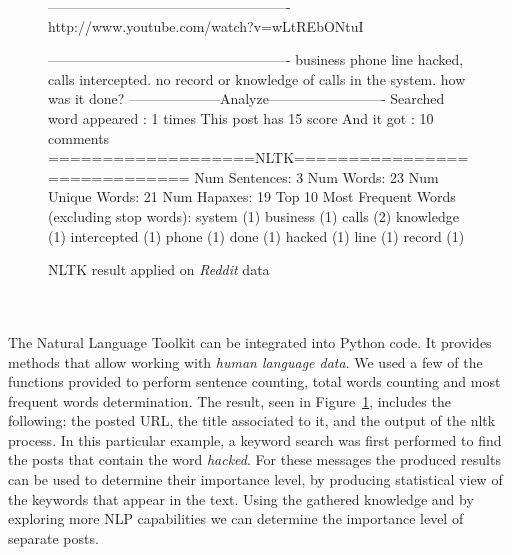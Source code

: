 \documentclass[12pt]{article}
\begin{document}
\begin{figure}[h]
\begin{footnotesize}
\begin{spverbatim}
----------------------------------------------------
http://www.youtube.com/watch?v=wLtREbONtuI 

----------------------------------------------------
business phone line hacked, calls intercepted. no record or
knowledge of calls in the system. how was it done?
--------------------Analyze-------------------------
Searched word appeared :  1  times
This post has  15  score
And it got  :  10  comments
===================NLTK=============================
	Num Sentences:           3
	Num Words:               23
	Num Unique Words:        21
	Num Hapaxes:             19
	Top 10 Most Frequent Words (excluding stop words):
		system (1)
		business (1)
		calls (2)
		knowledge (1)
		intercepted (1)
		phone (1)
		done (1)
		hacked (1)
		line (1)
		record (1)
\end{spverbatim}
\end{footnotesize}
\captionsetup{font=small}
\caption{NLTK result applied on \textit{Reddit} data}
\label{fig:nltk}
\end{figure}
\hfill \break
\\
\\
The Natural Language Toolkit \cite{nltk} can be integrated into Python code. It provides methods that allow working with \textit{human language data}. We used a few of the functions provided to perform sentence counting, total words counting and most frequent words determination.  The result, seen in Figure~\ref{fig:nltk}, includes the following: the posted URL, the title associated to it, and the output of the nltk process. In this particular example, a keyword search was first performed to find the posts that contain the word \textit{hacked}. For these messages the produced results can be used to determine their importance level, by producing statistical view of the keywords that appear in the text. Using the gathered knowledge and by exploring more NLP capabilities we can determine the importance level of separate posts.
\newpage
\end{document}
